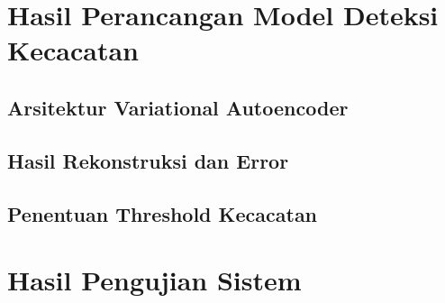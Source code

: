 \vspace{1em}

\section{Hasil Perancangan Model Deteksi Kecacatan}
\subsection{Arsitektur Variational Autoencoder}
\subsection{Hasil Rekonstruksi dan Error}
\subsection{Penentuan Threshold Kecacatan}

\vspace{1em}

\section{Hasil Pengujian Sistem}
